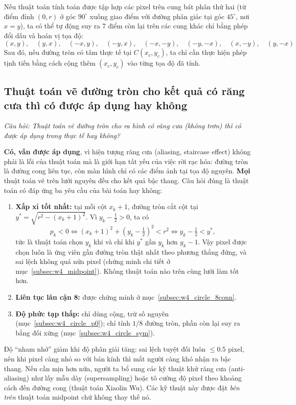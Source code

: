 Nếu thuật toán tính toán được tập hợp các pixel trên cung bát phân thứ hai (từ điểm đỉnh $(0, r)$ ở góc $90^\circ$ xuống giao điểm với đường phân giác tại góc $45^\circ$, nơi $x = y$), ta có thể tự động suy ra 7 điểm còn lại trên các cung khác chỉ bằng phép đổi dấu và hoán vị tọa độ:
\begin{equation}
(x, y), \quad (y, x), \quad (-x, y), \quad (-y, x), \quad (-x, -y), \quad (-y, -x), \quad (x, -y), \quad (y, -x)
\end{equation}
Sau đó, nếu đường tròn có tâm thực tế tại $C(x_c, y_c)$, ta chỉ cần thực hiện phép tịnh tiến bằng cách cộng thêm $(x_c, y_c)$ vào từng tọa độ đã tính.

\subsection{Thuật toán vẽ đường tròn cho kết quả có răng cưa thì có được áp dụng hay không}
\label{subsec:w4_circle_apply}

\textit{Câu hỏi: Thuật toán vẽ đường tròn cho ra hình có răng cưa (không trơn) thì có được áp dụng trong thực tế hay không?}

\textbf{Có, vẫn được áp dụng}, vì hiện tượng răng cưa (aliasing, staircase effect) không phải là lỗi của thuật toán mà là giới hạn tất yếu của việc rời rạc hóa: đường tròn là đường cong liên tục, còn màn hình chỉ có các điểm ảnh tại tọa độ nguyên. \textbf{Mọi} thuật toán vẽ trên lưới nguyên đều cho kết quả bậc thang. Câu hỏi đúng là thuật toán có đáp ứng ba yêu cầu của bài toán \citep[slide~3]{dhmt_lec4} hay không:
\begin{enumerate}
    \item \textbf{Xấp xỉ tốt nhất:} tại mỗi cột $x_k + 1$, đường tròn cắt cột tại $y^* = \sqrt{r^2 - (x_k + 1)^2}$. Vì $y_k - \tfrac12 > 0$, ta có
    \begin{equation}
    p_k < 0 \iff (x_k + 1)^2 + \left(y_k - \tfrac12\right)^2 < r^2 \iff y_k - \tfrac12 < y^*,
    \end{equation}
    tức là thuật toán chọn $y_k$ khi và chỉ khi $y^*$ gần $y_k$ hơn $y_k - 1$. Vậy pixel được chọn luôn là ứng viên gần đường tròn thật nhất theo phương thẳng đứng, và sai lệch không quá nửa pixel (chứng minh chi tiết ở mục~\ref{subsec:w4_midpoint}). Không thuật toán nào trên cùng lưới làm tốt hơn.
    \item \textbf{Liên tục lân cận 8:} được chứng minh ở mục~\ref{subsec:w4_circle_8conn}.
    \item \textbf{Độ phức tạp thấp:} chỉ dùng cộng, trừ số nguyên (mục~\ref{subsec:w4_circle_p0}); chỉ tính $1/8$ đường tròn, phần còn lại suy ra bằng đối xứng (mục~\ref{subsec:w4_circle_sym}).
\end{enumerate}
Độ ``nham nhở'' giảm khi độ phân giải tăng: sai lệch tuyệt đối luôn $\le 0.5$ pixel, nên khi pixel càng nhỏ so với bán kính thì mắt người càng khó nhận ra bậc thang. Nếu cần mịn hơn nữa, người ta bổ sung các kỹ thuật khử răng cưa (anti-aliasing) như lấy mẫu dày (supersampling) hoặc tô cường độ pixel theo khoảng cách đến đường cong (thuật toán Xiaolin Wu). Các kỹ thuật này được đặt \emph{bên trên} thuật toán midpoint chứ không thay thế nó.

